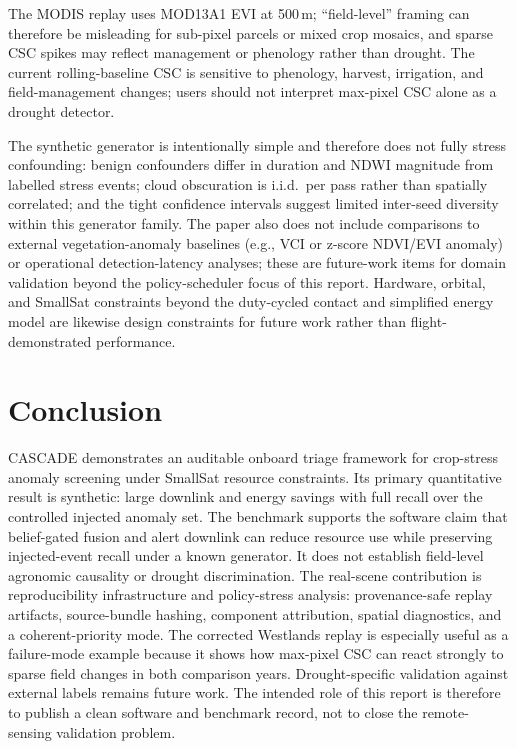 \documentclass[11pt]{article}
\begin{document}
The MODIS replay uses MOD13A1 EVI at 500\,m; ``field-level'' framing can therefore be misleading for sub-pixel parcels or mixed crop mosaics, and sparse CSC spikes may reflect management or phenology rather than drought. The current rolling-baseline CSC is sensitive to phenology, harvest, irrigation, and field-management changes; users should not interpret max-pixel CSC alone as a drought detector.

The synthetic generator is intentionally simple and therefore does not fully stress confounding: benign confounders differ in duration and NDWI magnitude from labelled stress events; cloud obscuration is i.i.d.\ per pass rather than spatially correlated; and the tight confidence intervals suggest limited inter-seed diversity within this generator family. The paper also does not include comparisons to external vegetation-anomaly baselines (e.g., VCI or z-score NDVI/EVI anomaly) or operational detection-latency analyses; these are future-work items for domain validation beyond the policy-scheduler focus of this report. Hardware, orbital, and SmallSat constraints beyond the duty-cycled contact and simplified energy model are likewise design constraints for future work rather than flight-demonstrated performance.

\section{Conclusion}

CASCADE demonstrates an auditable onboard triage framework for crop-stress anomaly screening under SmallSat resource constraints. Its primary quantitative result is synthetic: large downlink and energy savings with full recall over the controlled injected anomaly set. The benchmark supports the software claim that belief-gated fusion and alert downlink can reduce resource use while preserving injected-event recall under a known generator. It does not establish field-level agronomic causality or drought discrimination. The real-scene contribution is reproducibility infrastructure and policy-stress analysis: provenance-safe replay artifacts, source-bundle hashing, component attribution, spatial diagnostics, and a coherent-priority mode. The corrected Westlands replay is especially useful as a failure-mode example because it shows how max-pixel CSC can react strongly to sparse field changes in both comparison years. Drought-specific validation against external labels remains future work. The intended role of this report is therefore to publish a clean software and benchmark record, not to close the remote-sensing validation problem.
\end{document}
